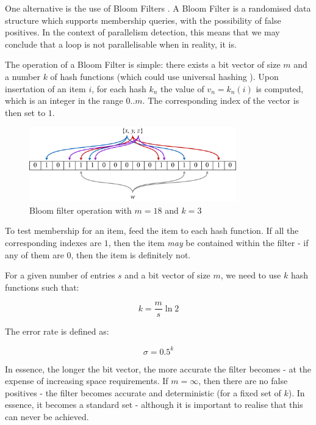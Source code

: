 	One alternative is the use of Bloom Filters \citep{Bloom1970}. A Bloom Filter is a randomised data structure which supports membership queries, with the possibility of false positives. In the context of parallelism detection, this means that we may conclude that a loop is not parallelisable when in reality, it is.
		
	The operation of a Bloom Filter is simple: there exists a bit vector of size $m$ and a number $k$ of hash functions (which could use universal hashing \citep{Carter1979}). Upon insertation of an item $i$, for each hash $k_n$ the value of $v_n=k_n(i)$ is computed, which is an integer in the range $0..m$. The corresponding index of the vector is then set to $1$.
		
	\begin{figure}[h!]
			\centering
			\includegraphics[width=0.8\textwidth]{graphics/bloomfilter.pdf}
			\caption{Bloom filter operation with $m=18$ and $k=3$ \citep{BloomFilterWikiDiagram}}
			\label{fig:bloom-filter}
	\end{figure}
		
	To test membership for an item, feed the item to each hash function. If all the corresponding indexes are $1$, then the item \emph{may} be contained within the filter - if any of them are $0$, then the item is definitely not.
	
	For a given number of entries $s$ and a bit vector of size $m$, we need to use $k$ hash functions such that:
	
	\begin{equation}
		k = \frac{m}{s} \ln 2
		\label{eqn:optimal-hashes}
	\end{equation}
	
	The error rate is defined as:
	
	\[
	\sigma = 0.5^k
	\]
	
	In essence, the longer the bit vector, the more accurate the filter becomes - at the expense of increasing space requirements. If $m=\infty$, then there are no false positives - the filter becomes accurate and deterministic (for a fixed set of $k$). In essence, it becomes a standard set - although it is important to realise that this can never be achieved.
	
